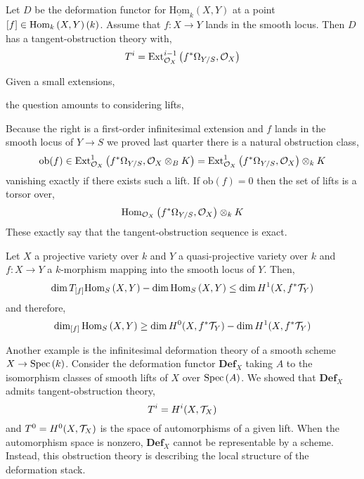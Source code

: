 \documentclass[12pt]{article}
\newcommand{\uHom}[3]{\underline{\mathrm{Hom}}_{#1}\left(#2, #3\right)}
\newcommand{\ob}{\mathrm{ob}}
\begin{document}
\begin{prop}
Let $D$ be the deformation functor for $\uHom{k}{X}{Y}$ at a point $[f] \in \mathrm{Hom}_{k} \left( X, Y \right)(k)$. Assume that $f : X \to Y$ lands in the smooth locus. Then $D$ has a tangent-obstruction theory with,
\[ T^i = \mathrm{Ext}^{i-1}_{\mathcal{O}_{X}} \left( f^* \Omega_{Y/S}, \mathcal{O}_{X} \right) \]
\end{prop}

\begin{prop}
Given a small extensions,
\begin{center}
\end{center}
the question amounts to considering lifts,
\begin{center}
\end{center}
Because the right is a first-order infinitesimal extension and $f$ lands in the smooth locus of $Y \to S$ we proved last quarter there is a natural obstruction class,
\[ \ob(f) \in \Ext{1}{\struct{X}}{f^* \Omega_{Y/S}}{\struct{X} \ot_B K} = \Ext{1}{\struct{X}}{f^* \Omega_{Y/S}}{\struct{X}} \ot_k K \]
vanishing exactly if there exists such a lift. If $\ob(f) = 0$ then the set of lifts is a torsor over,
\[ \mathrm{Hom}_{\mathcal{O}_{X}} \left( f^* \Omega_{Y/S}, \mathcal{O}_{X} \right) \otimes_k K \]
These exactly say that the tangent-obstruction sequence is exact.
\end{prop}

\begin{cor}
Let $X$ a projective variety over $k$ and $Y$ a quasi-projective variety over $k$ and $f : X \to Y$ a $k$-morphism mapping into the smooth locus of $Y$. Then,
\[ \dim T_{[f]} \mathrm{Hom}_{S} \left( X, Y \right) - \dim{\mathrm{Hom}_{S} \left( X, Y \right)} \le \dim H^1(X, f^* \mathcal{T}_Y) \]
and therefore,
\[ \dim_{[f]} \mathrm{Hom}_{S} \left( X, Y \right) \ge \dim H^0(X, f^* \mathcal{T}_Y) - \dim H^1(X, f^* \mathcal{T}_Y) \]
\end{cor}

\begin{rmk}
Another example is the infinitesimal deformation theory of a smooth scheme $X \to \mathrm{Spec}\left( k \right)$. Consider the deformation functor $\mathbf{Def}_X$ taking $A$ to the isomorphism classes of smooth lifts of $X$ over $\mathrm{Spec}\left( A \right)$. We showed that $\mathbf{Def}_X$ admits tangent-obstruction theory,
\[ T^i = H^i(X, \mathcal{T}_X) \]
and $T^0 = H^0(X, \mathcal{T}_X)$ is the space of automorphisms of a given lift. When the automorphism space is nonzero, $\mathbf{Def}_X$ cannot be representable by a scheme. Instead, this obstruction theory is describing the local structure of the deformation stack. 
\end{rmk}
\end{document}
